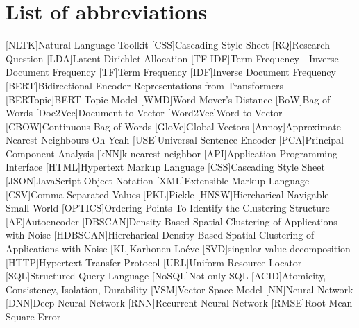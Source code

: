 \chapter*{List of abbreviations}


\begin{acronym}[XXXXXXXXX]
    [NLTK]{Natural Language Toolkit}
    [CSS]{Cascading Style Sheet}
    [RQ]{Research Question}
    [LDA]{Latent Dirichlet Allocation}
    [TF-IDF]{Term Frequency - Inverse Document Frequency}
    [TF]{Term Frequency}
    [IDF]{Inverse Document Frequency}
    [BERT]{Bidirectional Encoder Representations from Transformers}
    [BERTopic]{BERT Topic Model}
    [WMD]{Word Mover's Distance}
    [BoW]{Bag of Words}
    [Doc2Vec]{Document to Vector}
    [Word2Vec]{Word to Vector}
    [CBOW]{Continuous-Bag-of-Words}
    [GloVe]{Global Vectors}
    [Annoy]{Approximate Nearest Neighbours Oh Yeah}
    [USE]{Universal Sentence Encoder}
    [PCA]{Principal Component Analysis}
    [kNN]{k-nearest neighbor}
    [API]{Application Programming Interface}
    [HTML]{Hypertext Markup Language}
    [CSS]{Cascading Style Sheet}
    [JSON]{JavaScript Object Notation}
    [XML]{Extensible Markup Language}
    [CSV]{Comma Separated Values}
    [PKL]{Pickle}
    [HNSW]{Hiercharical Navigable Small World}
    [OPTICS]{Ordering Points To Identify the Clustering Structure}
    [AE]{Autoencoder}
    [DBSCAN]{Density-Based Spatial Clustering of Applications with Noise}
    [HDBSCAN]{Hiercharical Density-Based Spatial Clustering of Applications with Noise}
    [KL]{Karhonen-Loéve}
    [SVD]{singular value decomposition}
    [HTTP]{Hypertext Transfer Protocol}
    [URL]{Uniform Resource Locator}
    [SQL]{Structured Query Language}
    [NoSQL]{Not only SQL}
    [ACID]{Atomicity, Consistency, Isolation, Durability}
    [VSM]{Vector Space Model}
    [NN]{Neural Network}
    [DNN]{Deep Neural Network}
    [RNN]{Recurrent Neural Network}
    [RMSE]{Root Mean Square Error}

\end{acronym}
